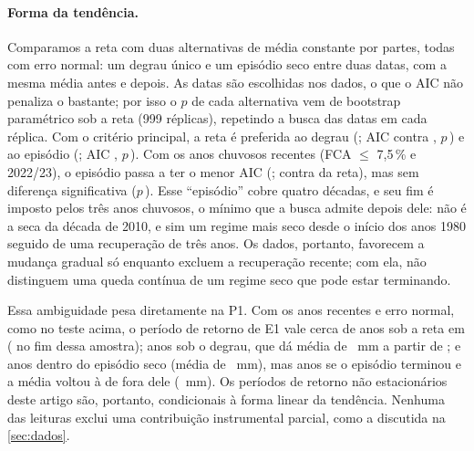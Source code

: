 \documentclass[11pt,a4paper]{article}
\begin{document}
\paragraph{Forma da tendência.} Comparamos a reta com duas alternativas de média constante por
partes, todas com erro normal: um degrau único e um episódio seco entre duas datas, com a mesma
média antes e depois. As datas são escolhidas nos dados, o que o AIC não penaliza o bastante; por
isso o $p$ de cada alternativa vem de bootstrap paramétrico sob a reta (999 réplicas), repetindo a
busca das datas em cada réplica. Com o critério principal, a reta é preferida ao degrau
(\AnoDegrauChuva; AIC \AICChuvaLinear{} contra \AICChuvaDegrau{}, $p$\,\PBootDegrau) e ao episódio
(\AnosEpisodio; AIC \AICEpisodio{}, $p$\,\PBootEpisodio). Com os anos chuvosos recentes
(FCA $\le$ 7,5\,\% e 2022/23), o episódio passa a ter o menor AIC (\AnosEpisodioRec; \AICEpisodioRec{}
contra \AICChuvaLinearRec{} da reta), mas sem diferença significativa ($p$\,\PBootEpisodioRec). Esse
``episódio'' cobre quatro décadas, e seu fim é imposto pelos três anos chuvosos, o mínimo que a busca
admite depois dele: não é a seca da década de 2010, e sim um regime mais seco desde o início dos
anos 1980 seguido de uma recuperação de três anos. Os dados, portanto, favorecem a mudança gradual
só enquanto excluem a recuperação recente; com ela, não distinguem uma queda contínua de um regime
seco que pode estar terminando.

Essa ambiguidade pesa diretamente na P1. Com os anos recentes e erro normal, como no teste acima, o
período de retorno de E1 vale cerca de \TFormaRetaUlt{} anos sob a reta em \UltimoAnoNS{}
(\TFormaRetaFim{} no fim dessa amostra); \TFormaDegrau{} anos sob o degrau, que dá média de
\MediaFormaDegrau{}~mm a partir de \AnoDegrauChuvaRec{}; e \TFormaEpDentro{} anos dentro do episódio seco
(média de \MediaFormaEpDentro{}~mm), mas \TFormaEpFora{} anos se o episódio terminou e a média voltou à
de fora dele (\MediaFormaEpFora{}~mm). Os períodos de retorno não estacionários deste artigo são,
portanto, condicionais à forma linear da tendência. Nenhuma das leituras exclui uma contribuição
instrumental parcial, como a discutida na \cref{sec:dados}.
\end{document}
